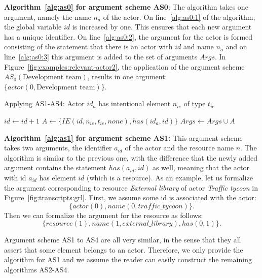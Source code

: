 \noindent\textbf{Algorithm~\ref{alg:as0} for argument scheme AS0}: The algorithm takes one argument, namely the name $n_{a}$ of the actor. On line~\ref{alg:as0:1} of the algorithm, the global variable $id$ is increased by one. This ensures that each new argument has a unique identifier. 
On line~\ref{alg:as0:2}, the argument for the actor is formed consisting of the statement that there is an actor with $id$ and name $n_{a}$ and on line~\ref{alg:as0:3} this argument is added to the set of arguments $Args$. In Figure~\ref{fig:examples:relevant-actor2}, the application of the argument scheme $AS_0(\text{Development team})$, results in one argument: $\{actor(0, \text{Development team})\}$.

\begin{algorithm}[h]
  \caption{Applying AS1-AS4: Actor $id_{a}$ has intentional element $n_{ie}$ of type $t_{ie}$}\label{alg:as1}
  \begin{algorithmic}[1]
    \State $id\gets id+1$
    \State $A\gets \{IE(id,n_{ie},t_{ie},none), has(id_{a},id)\}$
    \State $Args \gets Args\cup A$
    \EndProcedure
  \end{algorithmic}
\end{algorithm}
\noindent\textbf{Algorithm~\ref{alg:as1} for argument scheme AS1:} This argument scheme takes two arguments, the identifier $a_{id}$ of the actor and the resource name $n$. The algorithm is similar to the previous one, with the difference that the newly added argument contains the statement $has(a_{id},id)$ as well, meaning that the actor with id $a_{id}$ has element $id$ (which is a resource). As an example, let us formalize the argument corresponding to resource \emph{External library} of actor \emph{Traffic tycoon} in Figure~\ref{fig:transcripts:grl}. First, we assume some id is associated with the actor: $$\{actor(0),name(0,traffic\_tycoon)\}.$$ Then we can formalize the argument for the resource as follows: $$\{resource(1),name(1,external\_library),has(0,1)\}.$$

Argument scheme AS1 to AS4 are all very similar, in the sense that they all assert that some element belongs to an actor. Therefore, we only provide the algorithm for AS1 and we assume the reader can easily construct the remaining algorithms AS2-AS4.

